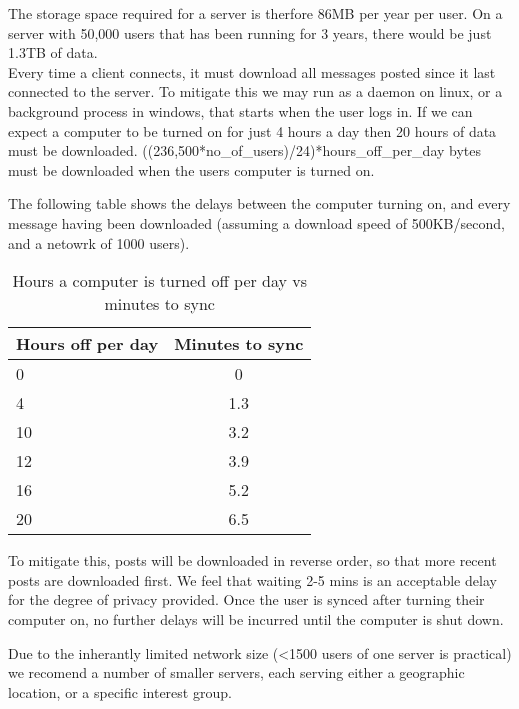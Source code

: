 The storage space required for a server is therfore 86MB per year per user. On a
server with 50,000 users that has been running for 3 years, there would be just
1.3TB of data.\\

Every time a client connects, it must download all messages posted since it last
connected to the server. To mitigate this we may run as a daemon on linux, or a
background process in windows, that starts when the user logs in. If we can
expect a computer to be turned on for just 4 hours a day then 20 hours of data
must be downloaded. ((236,500*no\_of\_users)/24)*hours\_off\_per\_day bytes must be
downloaded when the users computer is turned on.

The following table shows the delays between the computer turning on, and every
message having been downloaded (assuming a download speed of 500KB/second, and a
netowrk of 1000 users).

\begin{table}[h]
    \centering
    \begin{tabular}{lc}
    Hours off per day & Minutes to sync       \\ \hline
    0                 &  0 \\
    4                 &  1.3\\
    10                &  3.2\\
    12                &  3.9\\
    16                &  5.2\\
    20                &  6.5\\
    \end{tabular}
    \caption{Hours a computer is turned off per day vs minutes to sync}
\end{table}

To mitigate this, posts will be downloaded in reverse order, so that more recent
posts are downloaded first. We feel that waiting 2-5 mins is an acceptable delay
for the degree of privacy provided. Once the user is synced after turning their
computer on, no further delays will be incurred until the computer is shut down.

Due to the inherantly limited network size (\textless1500 users of one server is
practical) we recomend a number of smaller servers, each serving either a
geographic location, or a specific interest group.

